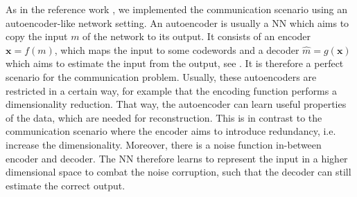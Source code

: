 \documentclass[conference]{IEEEtran}
\begin{document}
As in the reference work \cite{OShea2017}, we implemented the communication scenario using an autoencoder-like network setting. An autoencoder is usually a NN which aims to copy the input $m$ of the network to its output. It consists of an encoder $\mathbf{x}=f(m)$, which maps the input to some codewords and a decoder $\hat{m}=g(\mathbf{x})$ which aims to estimate the input from the output, see \cite{Goodfellow:2016:DL:3086952}. It is therefore a perfect scenario for the communication problem. Usually, these autoencoders are restricted in a certain way, for example that the encoding function performs a dimensionality reduction. That way, the autoencoder can learn useful properties of the data, which are needed for reconstruction. This is in contrast to the communication scenario where the encoder aims to introduce redundancy, i.e. increase the dimensionality. Moreover, there is a noise function in-between encoder and decoder. The NN therefore learns to represent the input in a higher dimensional space to combat the noise corruption, such that the decoder can still estimate the correct output. 
\end{document}
